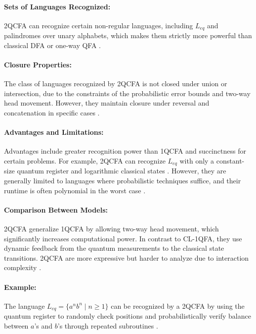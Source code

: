 \paragraph{Sets of Languages Recognized:}  
2QCFA can recognize certain non-regular languages, including $L_{eq}$ and palindromes over unary alphabets, which makes them strictly more powerful than classical DFA or one-way QFA \cite{ambainis2002two, li2015hybrid}.

\paragraph{Closure Properties:}  
The class of languages recognized by 2QCFA is not closed under union or intersection, due to the constraints of the probabilistic error bounds and two-way head movement. However, they maintain closure under reversal and concatenation in specific cases \cite{li2015hybrid}.

\paragraph{Advantages and Limitations:}  
Advantages include greater recognition power than 1QCFA and succinctness for certain problems. For example, 2QCFA can recognize $L_{eq}$ with only a constant-size quantum register and logarithmic classical states \cite{remscrim2020power}. However, they are generally limited to languages where probabilistic techniques suffice, and their runtime is often polynomial in the worst case \cite{remscrim2020lower}.

\paragraph{Comparison Between Models:}  
2QCFA generalize 1QCFA by allowing two-way head movement, which significantly increases computational power. In contrast to CL-1QFA, they use dynamic feedback from the quantum measurements to the classical state transitions. 2QCFA are more expressive but harder to analyze due to interaction complexity \cite{zheng2013state}.

\paragraph{Example:}  
The language $L_{eq} = \{ a^n b^n \mid n \geq 1 \}$ can be recognized by a 2QCFA by using the quantum register to randomly check positions and probabilistically verify balance between $a$'s and $b$'s through repeated subroutines \cite{ambainis2002two}.

